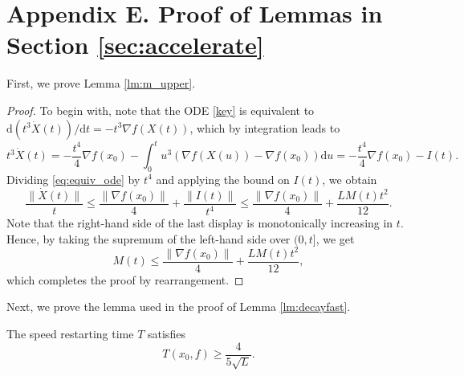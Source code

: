 \documentclass[twoside,11pt]{article}
\newcommand{\norm}[1]{\|#1\|}
\renewcommand{\d}{{\mathrm{d}}}
\begin{document}
\section*{Appendix E. Proof of Lemmas in Section \ref{sec:accelerate}}\label{app:e}
First, we prove Lemma \ref{lm:m_upper}.
\begin{proof}
  To begin with, note that the ODE \eqref{key} is equivalent to
  $\d(t^3\dot X(t))/\d t = -t^3\nabla f(X(t))$, which by integration
  leads to
\begin{equation}\label{eq:equiv_ode}
t^3\dot X(t)  = -\frac{t^4}{4}\nabla f(x_0) - \int^t_0 u^3(\nabla f(X(u)) - \nabla f(x_0)) \d u = -\frac{t^4}{4}\nabla f(x_0) - I(t).
\end{equation}
Dividing \eqref{eq:equiv_ode} by $t^4$ and applying the bound on $I(t)$, we obtain
\begin{equation*}
\frac{\norm{\dot X(t)}}{t} \le \frac{\norm{\nabla f(x_0)}}{4} + \frac{\|I(t)\|}{t^4} \le \frac{\norm{\nabla f(x_0)}}{4} + \frac{LM(t)t^2}{12}.
\end{equation*}
Note that the right-hand side of the last display is monotonically increasing in $t$. Hence, by taking the supremum of the left-hand side over $(0, t]$, we get
\begin{equation}\nonumber
M(t) \le \frac{\norm{\nabla f(x_0)}}{4} + \frac{LM(t)t^2}{12},
\end{equation}
which completes the proof by rearrangement.
  
\end{proof}

Next, we prove the lemma used in the proof of Lemma \ref{lm:decayfast}.
\begin{lemma}\label{lm:stopping}
The speed restarting time $T$ satisfies
\[T(x_0, f) \geq \frac{4}{5\sqrt{L}}.\]
\end{lemma}
\end{document}
